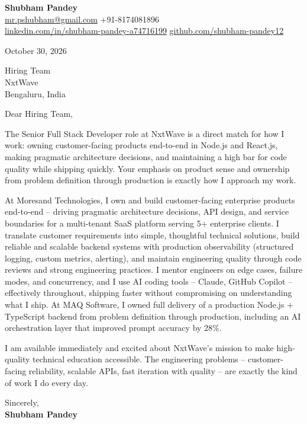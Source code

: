 \documentclass[a4paper,11pt]{article}
\begin{document}
\textbf{\Large Shubham Pandey}\\
\href{mailto:mr.pshubham@gmail.com}{mr.pshubham@gmail.com} \quad +91-8174081896\\
\href{https://www.linkedin.com/in/shubham-pandey-a74716199/}{linkedin.com/in/shubham-pandey-a74716199} \quad
\href{https://github.com/shubham-pandey12}{github.com/shubham-pandey12}

\vspace{1em}
October 30, 2026

\vspace{1em}
Hiring Team\\
NxtWave\\
Bengaluru, India

\vspace{1em}
Dear Hiring Team,

The Senior Full Stack Developer role at NxtWave is a direct match for how I work: owning customer-facing products end-to-end in Node.js and React.js, making pragmatic architecture decisions, and maintaining a high bar for code quality while shipping quickly. Your emphasis on product sense and ownership from problem definition through production is exactly how I approach my work.

At Moresand Technologies, I own and build customer-facing enterprise products end-to-end -- driving pragmatic architecture decisions, API design, and service boundaries for a multi-tenant SaaS platform serving 5+ enterprise clients. I translate customer requirements into simple, thoughtful technical solutions, build reliable and scalable backend systems with production observability (structured logging, custom metrics, alerting), and maintain engineering quality through code reviews and strong engineering practices. I mentor engineers on edge cases, failure modes, and concurrency, and I use AI coding tools -- Claude, GitHub Copilot -- effectively throughout, shipping faster without compromising on understanding what I ship. At MAQ Software, I owned full delivery of a production Node.js + TypeScript backend from problem definition through production, including an AI orchestration layer that improved prompt accuracy by 28\%.

I am available immediately and excited about NxtWave's mission to make high-quality technical education accessible. The engineering problems -- customer-facing reliability, scalable APIs, fast iteration with quality -- are exactly the kind of work I do every day.

\vspace{1em}
Sincerely,\\[0.5em]
\textbf{Shubham Pandey}
\end{document}
